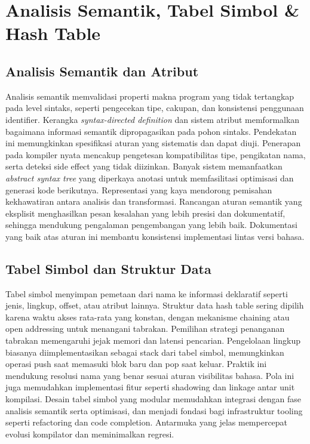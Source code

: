 \documentclass[../main.tex]{subfiles}
\begin{document}
\chapter{Analisis Semantik, Tabel Simbol \& Hash Table}
\label{ch:semantik-tabel-simbol}

\section{Analisis Semantik dan Atribut}
Analisis semantik memvalidasi properti makna program yang tidak tertangkap pada level sintaks, seperti pengecekan tipe, cakupan, dan konsistensi penggunaan identifier. Kerangka \textit{syntax-directed definition} dan sistem atribut memformalkan bagaimana informasi semantik dipropagasikan pada pohon sintaks.\cite{aho-dragon-book-2006} Pendekatan ini memungkinkan spesifikasi aturan yang sistematis dan dapat diuji.
Penerapan pada kompiler nyata mencakup pengetesan kompatibilitas tipe, pengikatan nama, serta deteksi side effect yang tidak diizinkan. Banyak sistem memanfaatkan \textit{abstract syntax tree} yang diperkaya anotasi untuk memfasilitasi optimisasi dan generasi kode berikutnya.\cite{pierce-types} Representasi yang kaya mendorong pemisahan kekhawatiran antara analisis dan transformasi.
Rancangan aturan semantik yang eksplisit menghasilkan pesan kesalahan yang lebih presisi dan dokumentatif, sehingga mendukung pengalaman pengembangan yang lebih baik. Dokumentasi yang baik atas aturan ini membantu konsistensi implementasi lintas versi bahasa.

\section{Tabel Simbol dan Struktur Data}
Tabel simbol menyimpan pemetaan dari nama ke informasi deklaratif seperti jenis, lingkup, offset, atau atribut lainnya. Struktur data hash table sering dipilih karena waktu akses rata-rata yang konstan, dengan mekanisme chaining atau open addressing untuk menangani tabrakan.\cite{aho-dragon-book-2006} Pemilihan strategi penanganan tabrakan memengaruhi jejak memori dan latensi pencarian.
Pengelolaan lingkup biasanya diimplementasikan sebagai stack dari tabel simbol, memungkinkan operasi push saat memasuki blok baru dan pop saat keluar. Praktik ini mendukung resolusi nama yang benar sesuai aturan visibilitas bahasa.\cite{muchnick} Pola ini juga memudahkan implementasi fitur seperti shadowing dan linkage antar unit kompilasi.
Desain tabel simbol yang modular memudahkan integrasi dengan fase analisis semantik serta optimisasi, dan menjadi fondasi bagi infrastruktur tooling seperti refactoring dan code completion. Antarmuka yang jelas mempercepat evolusi kompilator dan meminimalkan regresi.

\IfSubfilesClassLoaded{%
\printbibliography
}{}
\end{document}
